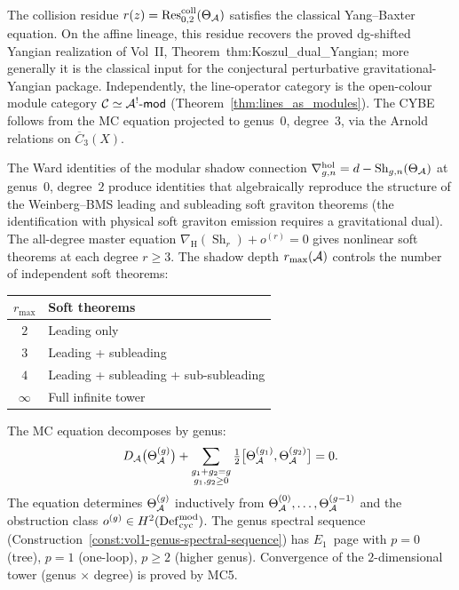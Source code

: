 \begin{theorem}\ClaimStatusProvedHere
\label{thm:thqg-g5-yangian}
The collision residue $r(z) = \operatorname{Res}^{\mathrm{coll}}_{0,2}(\Theta_{\mathcal{A}})$
satisfies the classical Yang--Baxter equation. On the affine lineage,
this residue recovers the proved dg-shifted Yangian realization of
Vol~II, Theorem~thm:Koszul\_dual\_Yangian; more generally it is the
classical input for the conjectural perturbative gravitational-Yangian
package. Independently, the line-operator category is the open-colour
module category $\mathcal{C} \simeq \mathcal{A}^!\text{-}\mathsf{mod}$
\textup{(}Theorem~\textup{\ref{thm:lines_as_modules})}. The CYBE follows
from the MC equation projected to genus~$0$, degree~$3$, via the Arnold
relations on $\overline{C}_3(X)$.
\end{theorem}

\begin{theorem}\ClaimStatusProvedHere
\label{thm:thqg-g6-soft-graviton}
The Ward identities of the modular shadow connection
$\nabla^{\mathrm{hol}}_{g,n} = d - \operatorname{Sh}_{g,n}(\Theta_{\mathcal{A}})$
at genus~$0$, degree~$2$ produce identities that algebraically reproduce
the structure of the Weinberg--BMS leading and subleading
soft graviton theorems \textup{(}the identification with physical soft
graviton emission requires a gravitational dual\textup{)}. The all-degree master equation
$\nabla_{\mathrm{H}}(\operatorname{Sh}_r) + o^{(r)} = 0$
gives nonlinear soft theorems at each degree $r \ge 3$. The shadow depth
$r_{\max}(\mathcal{A})$ controls the number of independent soft theorems:
\begin{center}
\renewcommand{\arraystretch}{1.1}
\small
\begin{tabular}{cl}
$r_{\max}$ & Soft theorems \\
\hline
$2$ & Leading only \\
$3$ & Leading + subleading \\
$4$ & Leading + subleading + sub-subleading \\
$\infty$ & Full infinite tower
\end{tabular}
\end{center}
\end{theorem}

\begin{theorem}\ClaimStatusProvedHere
\label{thm:thqg-g7-bootstrap}
The MC equation decomposes by genus:
\begin{equation}\label{eq:thqg-genus-bootstrap}
D_{\mathcal{A}}\bigl(\Theta_{\mathcal{A}}^{(g)}\bigr) +
\sum_{\substack{g_1 + g_2 = g \\ g_1, g_2 \ge 0}}
\tfrac{1}{2}\bigl[\Theta_{\mathcal{A}}^{(g_1)}, \Theta_{\mathcal{A}}^{(g_2)}\bigr] = 0.
\end{equation}
The equation determines $\Theta_{\mathcal{A}}^{(g)}$ inductively from
$\Theta_{\mathcal{A}}^{(0)}, \ldots, \Theta_{\mathcal{A}}^{(g-1)}$ and the obstruction class
$o^{(g)} \in H^2(\mathrm{Def}_{\mathrm{cyc}}^{\mathrm{mod}})$. The genus spectral sequence
(Construction~\ref{const:vol1-genus-spectral-sequence}) has $E_1$~page
with $p = 0$ (tree), $p = 1$ (one-loop), $p \ge 2$ (higher genus).
Convergence of the $2$-dimensional tower (genus $\times$ degree) is proved
by MC5.
\end{theorem}

